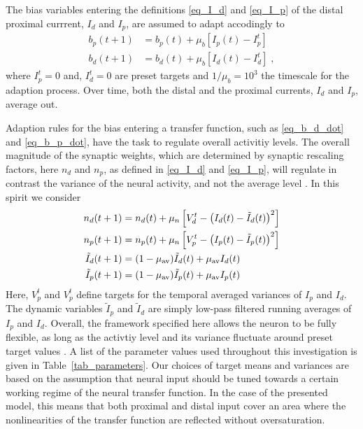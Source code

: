 \documentclass[utf8]{frontiersSCNS} %
\begin{document}
The bias variables entering the definitions
\eqref{eq_I_d} and \eqref{eq_I_p} of the distal
proximal currrent, $I_d$ and $I_p$, 
are assumed to adapt accodingly to
\begin{align}
\label{eq_b_p_dot}
b_p(t+1) &= b_p(t) + \mu_b \left[I_p(t) - I_p^t\right] \\
b_d(t+1) &= b_d(t) + \mu_b \left[I_d(t) - I_d^t\right] \;,
\label{eq_b_d_dot}
\end{align}
where $I_p^t=0$ and, $I_d^t=0$
are preset targets and $1/\mu_b=10^3$ the
timescale for the adaption process. Over
time, both the distal and the proximal 
currents, $I_d$ and $I_p$, average out.

Adaption rules for the bias entering a 
transfer function, such as
\eqref{eq_b_d_dot} and \eqref{eq_b_p_dot},
have the task to regulate overall activitiy
levels. The overall magnitude of the
synaptic weights, which are determined by 
synaptic rescaling factors, here $n_d$ and $n_p$, 
as defined in \eqref{eq_I_d} and \eqref{eq_I_p},
will regulate in contrast the variance of
the neural activity, and not the average
level \citep{schubert2021local}. In this
spirit we consider
\begin{align}
n_d(t+1) &= n_d(t) + 
\mu_n \left[V_d^t - \left( I_d(t) - \tilde{I}_d(t)\right)^2\right] \\
n_p(t+1) &= n_p(t) + 
\mu_n \left[V_p^t - \left( I_p(t) - \tilde{I}_p(t)\right)^2\right] \\
\tilde{I}_d(t+1) &= (1-\mu_{\rm av})\tilde{I}_d(t) + \mu_{\rm av} I_d(t) \\
\tilde{I}_p(t+1) &= (1-\mu_{\rm av})\tilde{I}_p(t) + \mu_{\rm av} I_p(t) 
\end{align}
Here, $V_p^t$ and $V_p^t$ define targets for 
the temporal averaged variances of $I_p$ 
and $I_d$.  
The dynamic variables $\tilde{I}_p$ and $\tilde{I}_d$ 
are simply low-pass filtered running averages of 
$I_p$ and $I_d$. Overall, the framework
specified here allows the neuron to be fully flexible,
as long as the activtiy level and its variance 
fluctuate around preset target values 
\citep{schubert2021local}. A list of 
the parameter values used throughout this investigation 
is given in Table~\ref{tab_parameters}. Our choices of
target means and variances are based on the assumption
that neural input should be tuned towards a certain
working regime of the neural transfer function. In
the case of the presented model, this means that both
proximal and distal input cover an area where the nonlinearities
of the transfer function are reflected without oversaturation.
\end{document}

